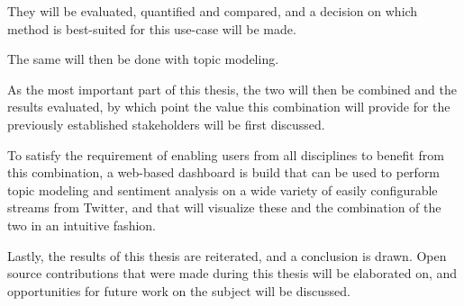 They will be evaluated, quantified and compared, and a decision on which method is best-suited for this use-case will be made.
\par
The same will then be done with topic modeling.
\par
As the most important part of this thesis, the two will then be combined and the results evaluated,
by which point the value this combination will provide for the previously established stakeholders will be first discussed.
\par
To satisfy the requirement of enabling users from all disciplines to benefit from this combination,
a web-based dashboard is build that can be used to perform topic modeling and sentiment analysis on a
wide variety of easily configurable streams from Twitter, and that will visualize these and the combination of the two in an intuitive fashion.
\par
Lastly, the results of this thesis are reiterated, and a conclusion is drawn.
Open source contributions that were made during this thesis will be elaborated on,
and opportunities for future work on the subject will be discussed.

